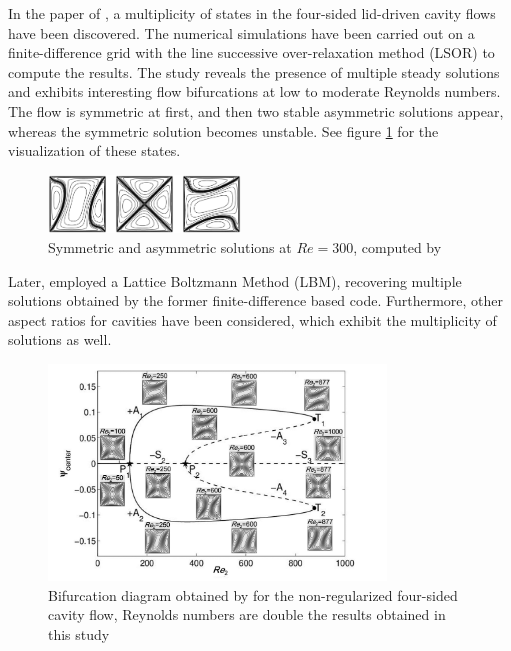 In the paper of \cite{wahba2009}, a multiplicity of states in the four-sided
lid-driven cavity flows have been discovered. The numerical simulations have
been carried out on a finite-difference grid with the line successive
over-relaxation method (LSOR) to compute the results. The study reveals the
presence of multiple steady solutions and exhibits interesting flow
bifurcations at low to moderate Reynolds numbers. The flow is symmetric at
first, and then two stable asymmetric solutions appear, whereas the symmetric
solution becomes unstable. See figure \ref{fig:4fsc_states} for the
visualization of these states.

\begin{figure}[h!]
  \centering
  \includegraphics[width=0.455\textwidth]{figs/fig_wahba2009}
  \caption{Symmetric and asymmetric solutions at $Re=300$, computed by
    \cite{wahba2009}}
  \label{fig:4fsc_states}
\end{figure}

Later, \cite{perumal2011} employed a Lattice Boltzmann Method (LBM), recovering
multiple solutions obtained by the former finite-difference based code.
Furthermore, other aspect ratios for cavities have been considered, which
exhibit the multiplicity of solutions as well. 

\begin{figure}[h]
  \centering
  \includegraphics[width=0.8\textwidth]{figs/fig2_chen2013.png}
  \caption{Bifurcation diagram obtained by \cite{chen2013} for the
    non-regularized four-sided cavity flow, Reynolds numbers are 
    double the results obtained in this study} 
  \label{fig:bif_diag_chen}
\end{figure}

